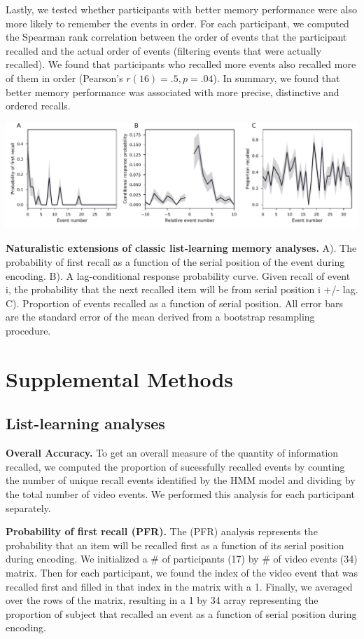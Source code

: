 \documentclass{article}
\begin{document}
Lastly, we tested whether participants with better memory performance were also more likely to remember the events in order.  For each participant, we computed the Spearman rank correlation between the order of events that the participant recalled and the actual order of events (filtering events that were actually recalled).  We found that participants who recalled more events also recalled more of them in order (Pearson's $r(16)=.5, p=.04$). In summary, we found that better memory performance was associated with more precise, distinctive and ordered recalls.

\begin{suppfigure}[t!]
\centering
\includegraphics[width=1\textwidth]{figs/supp3_list_learning.pdf}
\caption{\small \textbf{Naturalistic extensions of classic list-learning memory analyses.} A). The probability of first recall as a function of the serial position of the event during encoding. B). A lag-conditional response probability curve. Given recall of event i, the probability that the next recalled item will be from serial position i +/- lag. C). Proportion of events recalled as a function of serial position. All error bars are the standard error of the mean derived from a bootstrap resampling procedure.}
\label{fig:list-learning}
\end{suppfigure}

\section*{Supplemental Methods}
\subsection{List-learning analyses}
\textbf{Overall Accuracy.}  To get an overall measure of the quantity of information recalled, we computed the proportion of sucessfully recalled events by counting the number of unique recall events identified by the HMM model and dividing by the total number of video events.  We performed this analysis for each participant separately.

\textbf{Probability of first recall (PFR).}  The (PFR) analysis represents the probability that an item will be recalled first as a function of its serial position during encoding. We initialized a \# of participants (17) by \# of video events (34) matrix. Then for each participant, we found the index of the video event that was recalled first and filled in that index in the matrix with a 1.  Finally, we averaged over the rows of the matrix, resulting in a 1 by 34 array representing the proportion of subject that recalled an event as a function of serial position during encoding.
\end{document}
